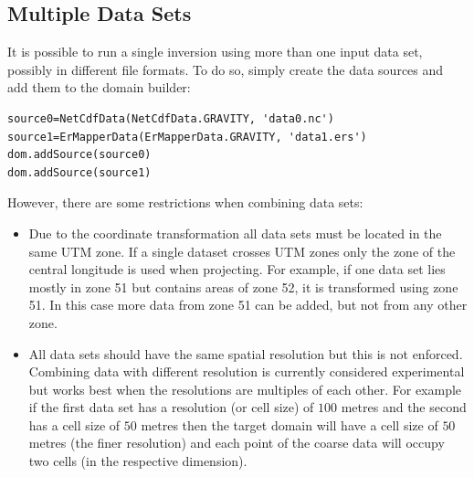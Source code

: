 \subsection{Multiple Data Sets}\label{SEC:P1:GRAV:REMARK:MULTIDATA}
It is possible to run a single inversion using more than one input data set,
possibly in different file formats.
To do so, simply create the data sources and add them to the domain builder:
\begin{verbatim}
source0=NetCdfData(NetCdfData.GRAVITY, 'data0.nc')
source1=ErMapperData(ErMapperData.GRAVITY, 'data1.ers')
dom.addSource(source0)
dom.addSource(source1)
\end{verbatim}
However, there are some restrictions when combining data sets:
\begin{itemize}
    \item Due to the coordinate transformation all data sets must be located in
        the same UTM zone. If a single dataset crosses UTM zones only the zone
        of the central longitude is used when projecting.
        For example, if one data set lies mostly in zone 51 but contains areas
        of zone 52, it is transformed using zone 51. In this case more data
        from zone 51 can be added, but not from any other zone.
    \item All data sets should have the same spatial resolution but this is not
        enforced. Combining data with different resolution is currently
        considered experimental but works best when the resolutions are
        multiples of each other. For example if the first data set has a
        resolution (or cell size) of $100$ metres and the second has a cell
        size of $50$ metres then the target domain will have a cell size of
        $50$ metres (the finer resolution) and each point of the coarse data
        will occupy two cells (in the respective dimension).
\end{itemize}

